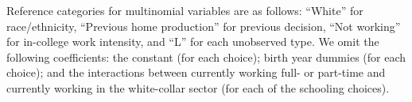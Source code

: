 \begin{table}[ht]
{\begin{threeparttable}
\medskip

Reference categories for multinomial variables are as follows: ``White'' for race/ethnicity, ``Previous home production'' for previous decision, ``Not working'' for in-college work intensity, and ``L'' for each unobserved type. We omit the following coefficients: the constant (for each choice); birth year dummies (for each choice); and the interactions between currently working full- or part-time and currently working in the white-collar sector (for each of the schooling choices). 
\end{threeparttable}
}
\end{table}
